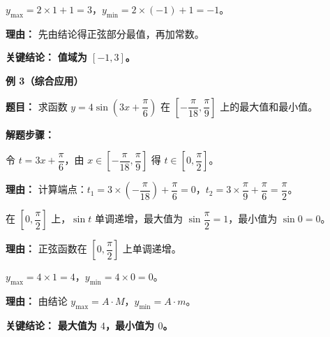 \begin{examplebox}
\begin{description}[style=nextline, leftmargin=2.8em, labelsep=0.5em, itemsep=0.45em]
		\item[\textbf{第三步（加常数得结果）：}] $y_{\max}=2\times1+1=3$，$y_{\min}=2\times(-1)+1=-1$。
			\par\textbf{理由：} 先由结论得正弦部分最值，再加常数。
	\end{description}

	\textbf{\textcolor{CExample}{关键结论：}}
	\textbf{值域为 $[-1,3]$。}

	\medskip
	\textbf{\textcolor{CExample}{例 3（综合应用）}}

	\textbf{\textcolor{CExample}{题目：}}
	求函数 $y=4\sin(3x+\dfrac{\pi}{6})$ 在 $[-\dfrac{\pi}{18},\dfrac{\pi}{9}]$ 上的最大值和最小值。

	\textbf{\textcolor{CExample}{解题步骤：}}
	\begin{description}[style=nextline, leftmargin=2.8em, labelsep=0.5em, itemsep=0.45em]
		\item[\textbf{第一步（换元映射）：}] 令 $t=3x+\dfrac{\pi}{6}$，由 $x\in[-\dfrac{\pi}{18},\dfrac{\pi}{9}]$ 得 $t\in[0,\dfrac{\pi}{2}]$。
			\par\textbf{理由：} 计算端点：$t_1=3\times(-\dfrac{\pi}{18})+\dfrac{\pi}{6}=0$，$t_2=3\times\dfrac{\pi}{9}+\dfrac{\pi}{6}=\dfrac{\pi}{2}$。

		\item[\textbf{第二步（正弦最值）：}] 在 $[0,\dfrac{\pi}{2}]$ 上，$\sin t$ 单调递增，最大值为 $\sin\dfrac{\pi}{2}=1$，最小值为 $\sin0=0$。
			\par\textbf{理由：} 正弦函数在 $[0,\dfrac{\pi}{2}]$ 上单调递增。

		\item[\textbf{第三步（乘系数得结果）：}] $y_{\max}=4\times1=4$，$y_{\min}=4\times0=0$。
			\par\textbf{理由：} 由结论 $y_{\max}=A\cdot M$，$y_{\min}=A\cdot m$。
	\end{description}

	\textbf{\textcolor{CExample}{关键结论：}}
	\textbf{最大值为 $4$，最小值为 $0$。}
\end{examplebox}
